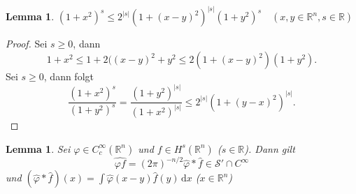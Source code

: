 \documentclass[
paper=a4,
bibtotocnumbered,
liststotocnumbered,
tablecaptionabove,
pointlessnumbers,
twoside,
openright,
10pt
]
{report}
\let\phi\varphi
\newtheorem{lem}[thm]{Lemma}
\theoremstyle{definition}
\numberwithin{equation}{chapter}
\begin{document}
\begin{lem}
$(1+x^2)^s\le 2^{|s|} (1+(x-y)^2)^{|s|} (1+y^2)^s \quad (x,y\in \mathbb R^n, s\in \mathbb R)$
\end{lem}
\begin{proof}
Sei $s\ge 0$, dann 
\begin{equation}
1+x^2 \le 1+ 2((x-y)^2+y^2 \le 2 (1+(x-y)^2)(1+y^2).
\end{equation}
Sei $s\ge 0$, dann folgt
\begin{equation}
\frac{(1+x^2)^s}{(1+y^2)^s} = \frac{(1+y^2)^{|s|}}{(1+x^2)^{|s|}} \le 2^{|s|} (1+(y-x)^2)^{|s|}.
\end{equation}
\end{proof}
\begin{lem}
Sei $\phi \in C_c^\infty(\mathbb R^n)$ und $f\in H^s(\mathbb R^n)$ ($s\in \mathbb R$). Dann gilt
\begin{equation}
\widehat{\phi f} = (2\pi)^{-n/2} \hat \phi * \hat f\in \mathcal S' \cap C^\infty
\end{equation}
und $(\hat \phi * \hat f) (x) = \int \hat \phi(x-y) \hat f(y)\, \mathrm dx$ ($x\in \mathbb R^n$)
\end{lem}
\end{document}
